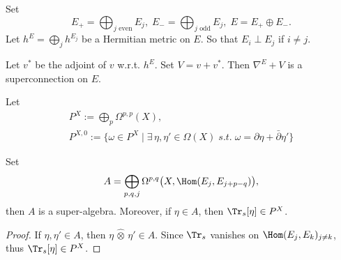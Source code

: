 Set 
\[
E_+=\bigoplus_{j\text{ even}}E_j,\;
E_-= \bigoplus_{j\text{ odd}}E_j,\;
E=E_+\oplus E_-.
\]
Let $h^E=\bigoplus\limits_j h^{E_j}$ be a Hermitian metric on $E$. 
So that $E_i\perp E_j$ if $i\neq j$. 

Let $v^*$ be the adjoint of $v$ w.r.t. $h^E$. Set $V=v+v^*$. 
Then $\nabla^E+V$ is a superconnection on $E$.

Let 
\begin{gather*}
    P^X:=\bigoplus_p\Omega^{p,p}(X), \\
    P^{X,0}:=\{\omega\in P^X\mid\exists\,\eta,\eta'\in\Omega(X)
    \;s.t.\;\omega=\partial\eta+\bar{\partial}\eta'\}
\end{gather*}

\begin{proposition}
    Set 
    \[
    A=\bigoplus_{p,q,j}\Omega^{p,q}\big(X,\Hom(E_j,E_{j+p-q})\big),
    \]
    then $A$ is a super-algebra. Moreover, if $\eta\in A$, then 
    $\Tr_s[\eta]\in P^X$.
\end{proposition}
\begin{proof}
    If $\eta,\eta'\in A$, then $\eta\,\hat{\otimes}\,\eta'\in A$. 
    Since $\Tr_s$ vanishes on $\Hom(E_j,E_k)_{j\neq k}$, thus 
    $\Tr_s[\eta]\in P^X$.
\end{proof}

